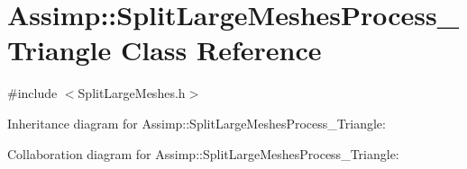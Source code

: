 \hypertarget{class_assimp_1_1_split_large_meshes_process___triangle}{\section{Assimp\+:\+:Split\+Large\+Meshes\+Process\+\_\+\+Triangle Class Reference}
\label{class_assimp_1_1_split_large_meshes_process___triangle}
}


{\ttfamily \#include $<$Split\+Large\+Meshes.\+h$>$}



Inheritance diagram for Assimp\+:\+:Split\+Large\+Meshes\+Process\+\_\+\+Triangle\+:


Collaboration diagram for Assimp\+:\+:Split\+Large\+Meshes\+Process\+\_\+\+Triangle\+:
